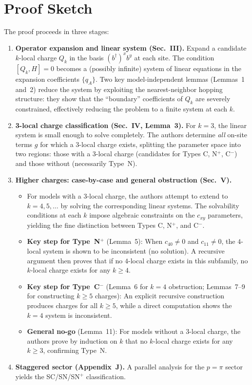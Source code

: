 \documentclass[11pt,a4paper]{article}
\begin{document}
\section{Proof Sketch}

The proof proceeds in three stages:

\begin{enumerate}
  \item \textbf{Operator expansion and linear system (Sec.~III).}
    Expand a candidate $k$-local charge $Q_k$ in the basis $(b^\dagger)^x b^y$ at each site. The condition $[Q_k, H] = 0$ becomes a (possibly infinite) system of linear equations in the expansion coefficients $\{q_A\}$. Two key model-independent lemmas (Lemmas~1 and~2) reduce the system by exploiting the nearest-neighbor hopping structure: they show that the ``boundary'' coefficients of $Q_k$ are severely constrained, effectively reducing the problem to a finite system at each $k$.

  \item \textbf{3-local charge classification (Sec.~IV, Lemma~3).}
    For $k=3$, the linear system is small enough to solve completely. The authors determine \emph{all} on-site terms $g$ for which a $3$-local charge exists, splitting the parameter space into two regions: those with a $3$-local charge (candidates for Types C, N$^+$, C$^-$) and those without (necessarily Type~N).

  \item \textbf{Higher charges: case-by-case and general obstruction (Sec.~V).}
    \begin{itemize}[nosep]
      \item For models with a $3$-local charge, the authors attempt to extend to $k=4,5,\ldots$ by solving the corresponding linear systems. The solvability conditions at each $k$ impose algebraic constraints on the $c_{xy}$ parameters, yielding the fine distinction between Types C, N$^+$, and C$^-$.
      \item \textbf{Key step for Type~N$^+$} (Lemma~5): When $c_{40}\neq 0$ and $c_{11}\neq 0$, the $4$-local system is shown to be inconsistent (no solution). A recursive argument then proves that if no $4$-local charge exists in this subfamily, no $k$-local charge exists for any $k\ge 4$.
      \item \textbf{Key step for Type~C$^-$} (Lemma~6 for $k=4$ obstruction; Lemmas~7--9 for constructing $k\ge 5$ charges): An explicit recursive construction produces charges for all $k\ge 5$, while a direct computation shows the $k=4$ system is inconsistent.
      \item \textbf{General no-go} (Lemma~11): For models without a $3$-local charge, the authors prove by induction on $k$ that no $k$-local charge exists for any $k\ge 3$, confirming Type~N.
    \end{itemize}

  \item \textbf{Staggered sector (Appendix~J).}
    A parallel analysis for the $p=\pi$ sector yields the SC/SN/SN$^+$ classification.
\end{enumerate}
\end{document}
